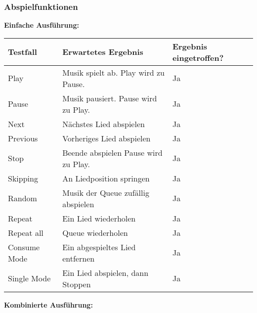 \newpage
\subsubsection{Abspielfunktionen}
\textbf{Einfache Ausführung:}
\\
\begin{tabularx}{\textwidth}{|X|X|p{3cm}|}
    \hline
    \textbf{Testfall} & \textbf{Erwartetes Ergebnis} & \textbf{Ergebnis eingetroffen?}\\
    \hline
    Play & Musik spielt ab. Play wird zu Pause. & Ja\\
    \hline
    Pause & Musik pausiert. Pause wird zu Play. & Ja\\
    \hline
    Next & Nächstes Lied abspielen & Ja\\
    \hline
    Previous & Vorheriges Lied abspielen & Ja\\
    \hline
    Stop & Beende abspielen Pause wird zu Play. & Ja\\
    \hline
    Skipping & An Liedposition springen & Ja\\
    \hline
    Random & Musik der Queue zufällig abspielen & Ja\\
    \hline 
    Repeat & Ein Lied wiederholen & Ja\\
    \hline
    Repeat all & Queue wiederholen & Ja\\
    \hline
    Consume Mode & Ein abgespieltes Lied entfernen & Ja\\
    \hline
    Single Mode & Ein Lied abspielen, dann Stoppen & Ja\\
    \hline
\end{tabularx}
\newpage
\textbf{Kombinierte Ausführung:}
\\
